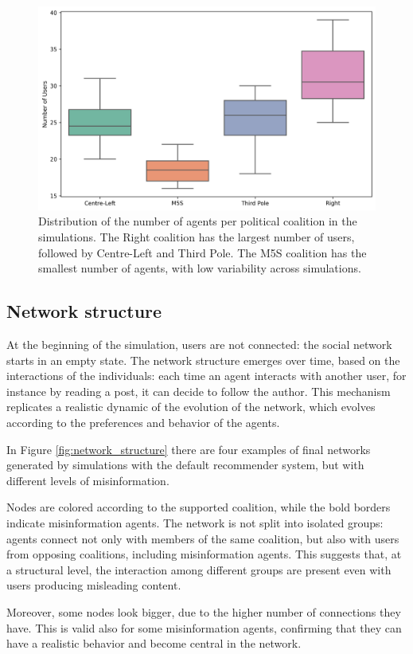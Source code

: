\begin{figure}[h]
    \centering
    \includegraphics[width=0.6\linewidth]{Images/Network/population_composition_DefaultRecSys.png}
    \caption{Distribution of the number of agents per political coalition in the simulations.
    The Right coalition has the largest number of users, followed by Centre-Left and Third Pole.
    The M5S coalition has the smallest number of agents, with low variability across simulations.}
    \label{fig:population}
\end{figure}


\subsection{Network structure}
At the beginning of the simulation, users are not connected: the social network starts in an empty state.
The network structure emerges over time, based on the interactions of the individuals: each time an agent interacts with another user, for instance by reading a post, it can decide to follow the author.
This mechanism replicates a realistic dynamic of the evolution of the network, which evolves according to the preferences and behavior of the agents.

\medskip
In Figure \ref{fig:network_structure} there are four examples of final networks generated by simulations with the default recommender system, but with different levels of misinformation.

Nodes are colored according to the supported coalition, while the bold borders indicate misinformation agents.
The network is not split into isolated groups: agents connect not only with members of the same coalition, but also with users from opposing coalitions, including misinformation agents.
This suggests that, at a structural level, the interaction among different groups are present even with users producing misleading content.

Moreover, some nodes look bigger, due to the higher number of connections they have.
This is valid also for some misinformation agents, confirming that they can have a realistic behavior and become central in the network.

